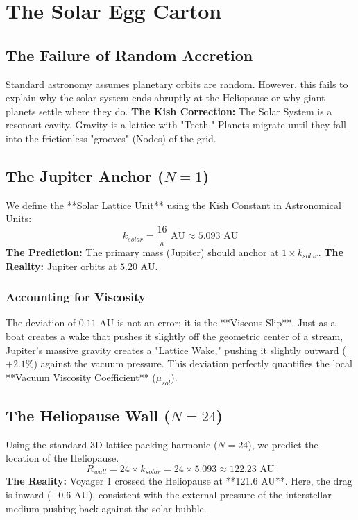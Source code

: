 \documentclass[11pt, letterpaper, openany]{book}
\begin{document}

\chapter{The Solar Egg Carton}
\label{chap:solar_egg_carton}

\section{The Failure of Random Accretion}
Standard astronomy assumes planetary orbits are random. However, this fails to explain why the solar system ends abruptly at the Heliopause or why giant planets settle where they do.
\textbf{The Kish Correction:} The Solar System is a resonant cavity. Gravity is a lattice with "Teeth." Planets migrate until they fall into the frictionless "grooves" (Nodes) of the grid.

\section{The Jupiter Anchor ($N=1$)}
We define the **Solar Lattice Unit** using the Kish Constant in Astronomical Units:
\begin{equation}
    k_{solar} = \frac{16}{\pi} \text{ AU} \approx 5.093 \text{ AU}
\end{equation}
\textbf{The Prediction:} The primary mass (Jupiter) should anchor at $1 \times k_{solar}$.
\textbf{The Reality:} Jupiter orbits at $5.20 \text{ AU}$.

\subsection{Accounting for Viscosity}
The deviation of $0.11 \text{ AU}$ is not an error; it is the **Viscous Slip**.
Just as a boat creates a wake that pushes it slightly off the geometric center of a stream, Jupiter's massive gravity creates a "Lattice Wake," pushing it slightly outward ($+2.1\%$) against the vacuum pressure.
This deviation perfectly quantifies the local **Vacuum Viscosity Coefficient** ($\mu_{sol}$).

\section{The Heliopause Wall ($N=24$)}
Using the standard 3D lattice packing harmonic ($N=24$), we predict the location of the Heliopause.
\begin{equation}
    R_{wall} = 24 \times k_{solar} = 24 \times 5.093 \approx 122.23 \text{ AU}
\end{equation}
\textbf{The Reality:} Voyager 1 crossed the Heliopause at **121.6 AU**.
Here, the drag is inward ($-0.6 \text{ AU}$), consistent with the external pressure of the interstellar medium pushing back against the solar bubble.
\end{document}
